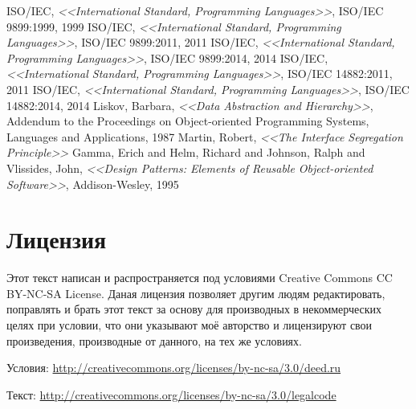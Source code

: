 \documentclass[a4paper,12pt,oneside]{article}
\begin{document}
\begin{thebibliography}{99}
 ISO/IEC, \textit{<<International Standard, Programming Languages>>}, ISO/IEC 9899:1999, 1999
 ISO/IEC, \textit{<<International Standard, Programming Languages>>}, ISO/IEC 9899:2011, 2011
 ISO/IEC, \textit{<<International Standard, Programming Languages>>}, ISO/IEC 9899:2014, 2014
 ISO/IEC, \textit{<<International Standard, Programming Languages>>}, ISO/IEC 14882:2011, 2011
 ISO/IEC, \textit{<<International Standard, Programming Languages>>}, ISO/IEC 14882:2014, 2014
 Liskov, Barbara, \textit{<<Data Abstraction and Hierarchy>>}, Addendum to the Proceedings on Object-oriented Programming Systems, Languages and Applications, 1987
 Martin, Robert, \textit{<<The Interface Segregation Principle>>}
 Gamma, Erich and Helm, Richard and Johnson, Ralph and Vlissides, John, \textit{<<Design Patterns: Elements of Reusable Object-oriented Software>>}, Addison-Wesley, 1995
\end{thebibliography}

\pagebreak
\section*{Лицензия}

Этот текст написан и распространяется под условиями Creative Commons CC BY-NC-SA License. Даная лицензия позволяет другим людям редактировать, поправлять и брать этот текст за основу для производных в некоммерческих целях при условии, что они указывают моё авторство и лицензируют свои произведения, производные от данного, на тех же условиях.

Условия: \url{http://creativecommons.org/licenses/by-nc-sa/3.0/deed.ru}

Текст: \url{http://creativecommons.org/licenses/by-nc-sa/3.0/legalcode}

\pagebreak
\printindex
\end{document}
